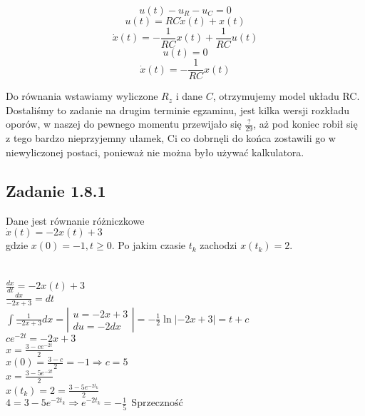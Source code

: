\begin{equation}
u(t) - u_{R} - u_{C} = 0 
\end{equation}
\begin{equation*}
u(t) = RC\dot{x}(t)+x(t) 
\end{equation*}
\begin{equation}
\dot{x}(t) = -\frac{1}{RC}x(t) + \frac{1}{RC}u(t)
\end{equation}
\begin{equation*}
u(t)=0
\end{equation*}
\begin{equation}
\dot{x}(t) = -\frac{1}{RC}x(t)
\end{equation}

Do równania wstawiamy wyliczone $R_{z}$ i dane $C$, otrzymujemy model układu RC. \\
Dostaliśmy to zadanie na drugim terminie egzaminu, jest kilka wersji rozkładu oporów, w naszej do pewnego momentu przewijało się $\frac{?}{29}$, aż pod koniec robił się z tego bardzo nieprzyjemny ułamek, Ci co dobrnęli do końca zostawili go w niewyliczonej postaci, ponieważ nie można było używać kalkulatora. 	
	
\pagebreak
\subsection*{Zadanie 1.8.1} {\color{darkgray}
	Dane jest równanie różniczkowe\\
	$\dot{x}(t)=-2x(t)+3$\\
	gdzie $x(0)=-1, t\geqslant 0$. Po jakim czasie $t_k$ zachodzi $x(t_k)=2$.\\
}\lineh
\\\\
$\frac{dx}{dt}=-2x(t)+3$\\
$\frac{dx}{-2x+3}=dt$\\
$\int \frac{1}{-2x+3} dx = \left|\begin{array}{c}u=-2x+3 \\du=-2dx\end{array}\right|=-\frac 12 \ln |-2x+3|=t+c$\\
$ce^{-2t}=-2x+3$\\
$x=\frac{3-ce^{-2t}}{2}$\\
$x(0)=\frac{3-c}{2}=-1 \Rightarrow c=5$\\
$x=\frac{3-5e^{-2t}}{2}$\\
$x(t_k)=2=\frac{3-5e^{-2t_k}}{2}$\\
$4=3-5e^{-2t_k} \Rightarrow e^{-2t_k}=-\frac 15 \ \ \boxed{\text{Sprzeczność}}$\\





